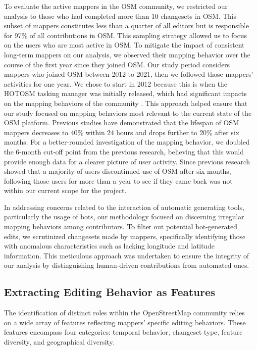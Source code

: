 \documentclass[manuscript,screen,review]{acmart}
\begin{document}
To evaluate the active mappers in the OSM community, we restricted our analysis to those who had completed more than 10 changesets in OSM. This subset of mappers constitutes less than a quarter of all editors but is responsible for 97\% of all contributions in OSM. This sampling strategy allowed us to focus on the users who are most active in OSM. To mitigate the impact of consistent long-term mappers on our analysis, we observed their mapping behavior over the course of the first year since they joined OSM. Our study period considers mappers who joined OSM between 2012 to 2021, then we followed those mappers' activities for one year. We chose to start in 2012 because this is when the HOTOSM tasking manager was initially released, which had significant impacts on the mapping behaviors of the community \cite{herfort2021evolution}. This approach helped ensure that our study focused on mapping behaviors most relevant to the current state of the OSM platform. Previous studies\cite{BeginDR18} have demonstrated that the lifespan of OSM mappers decreases to 40\% within 24 hours and drops further to 20\% after six months. For a better-rounded investigation of the mapping behavior, we doubled the 6-month cut-off point from the previous research, believing that this would provide enough data for a clearer picture of user activity. Since previous research showed that a majority of users discontinued use of OSM after six months, following those users for more than a year to see if they came back was not within our current scope for the project.

In addressing concerns related to the interaction of automatic generating tools, particularly the usage of bots, our methodology focused on discerning irregular mapping behaviors among contributors. To filter out potential bot-generated edits, we scrutinized changesets made by mappers, specifically identifying those with anomalous characteristics such as lacking longitude and latitude information. This meticulous approach was undertaken to ensure the integrity of our analysis by distinguishing human-driven contributions from automated ones.

\subsection{Extracting Editing Behavior as Features} \label{feature_group}

The identification of distinct roles within the OpenStreetMap community relies on a wide array of features reflecting mappers' specific editing behaviors. These features encompass four categories: temporal behavior, changeset type, feature diversity, and geographical diversity.
\end{document}

